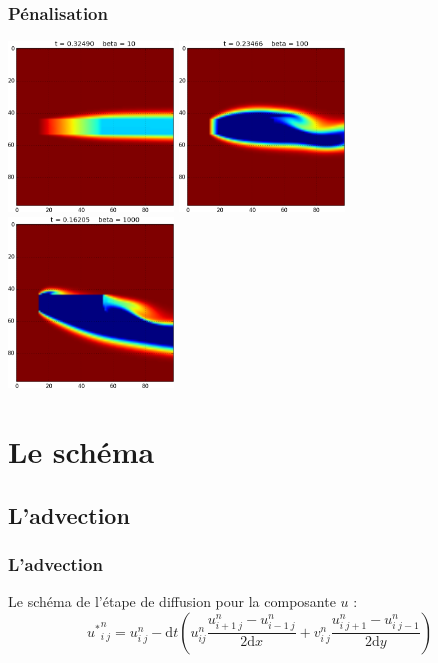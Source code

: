 \documentclass{beamer}
\renewcommand{\d}{\textrm{d}}
\begin{document}
  \begin{frame}
    \frametitle{Pénalisation}
    \begin{center}
      \includegraphics[width=0.33\textwidth]{penalisation_10.png}
      \includegraphics[width=0.33\textwidth]{penalisation_100.png}
      \includegraphics[width=0.33\textwidth]{penalisation_1000.png}
    \end{center}
  \end{frame}
  
\section{Le schéma}

\subsection{L'advection}
\begin{frame}
  \frametitle{L'advection}
    Le schéma de l'étape de diffusion pour la composante $u$ :
  \[{u^*}_{i \ j}^{n} = u_{i \ j}^n - {\d t}\left( u_{ij}^n \frac{u_{i+1
      \ j}^n-u_{i-1 \ j}^n}{2 \d x} + v_{i \ j}^{n} \frac{u_{i \
      j+1}^n-u_{i \ j-1}^n}{2 \d y}\right)
  \]
  \end{frame}		
  
\end{document}
